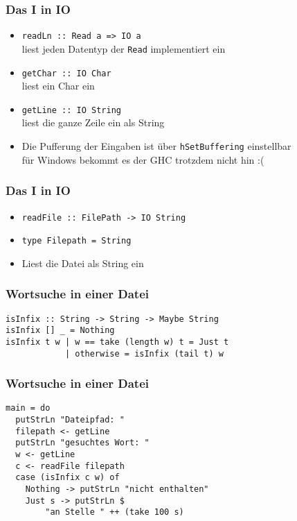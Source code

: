 \begin{frame}
\frametitle{Das I in IO}
\begin{block}{\vspace*{-3ex}}
\begin{itemize}
  \item \lstinline|readLn :: Read a => IO a|\\ liest jeden Datentyp der \lstinline|Read| implementiert ein
  \item \lstinline|getChar :: IO Char|\\ liest ein Char ein
  \item \lstinline|getLine :: IO String|\\ liest die ganze Zeile ein als String
  \item Die Pufferung der Eingaben ist über \lstinline|hSetBuffering| einstellbar\\ für Windows bekommt es der GHC trotzdem nicht hin :(
\end{itemize}
\end{block}
\end{frame}

\begin{frame}
\frametitle{Das I in IO}
\begin{block}{\vspace*{-3ex}}
\begin{itemize}
  \item \lstinline|readFile :: FilePath -> IO String|
  \item \lstinline|type Filepath = String|
  \item Liest die Datei als String ein
\end{itemize}
\end{block}
\end{frame}

\begin{frame}[fragile]
\frametitle{Wortsuche in einer Datei}
\begin{lstlisting}
isInfix :: String -> String -> Maybe String
isInfix [] _ = Nothing
isInfix t w | w == take (length w) t = Just t
            | otherwise = isInfix (tail t) w
\end{lstlisting}	
\end{frame}

\begin{frame}[fragile]
\frametitle{Wortsuche in einer Datei}
\begin{lstlisting}
main = do
  putStrLn "Dateipfad: "
  filepath <- getLine
  putStrLn "gesuchtes Wort: "
  w <- getLine
  c <- readFile filepath
  case (isInfix c w) of
    Nothing -> putStrLn "nicht enthalten"
    Just s -> putStrLn $
        "an Stelle " ++ (take 100 s)
\end{lstlisting}	
\end{frame}

